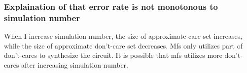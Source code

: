 \documentclass{rpt}
\begin{document}
\subsubsection*{Explaination of that error rate is not monotonous to simulation number}
When I increase simulation number,
the size of approximate care set increases,
while the size of approximate don't-care set decreases.
Mfs only utilizes part of don't-cares to synthesize the circuit.
It is possible that mfs utilizes more don't-cares after increasing simulation number.
\end{document}
